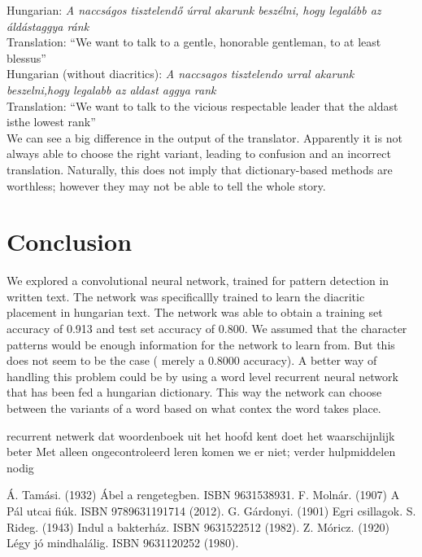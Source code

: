 \documentclass[11pt]{article}
\def\tab{\hspace*{1cm}}
\begin{document}
\tab Hungarian: \textit{A naccságos tisztelendő úrral akarunk beszélni, hogy legalább az áldást\break\tab aggya ránk}\\
\tab Translation: ``We want to talk to a gentle, honorable gentleman, to at least bless\break\tab us''\\[2mm]
\tab Hungarian (without diacritics): \textit{A naccsagos tisztelendo urral akarunk beszelni,\break\tab hogy legalabb az aldast aggya rank}\\
\tab Translation: ``We want to talk to the vicious respectable leader that the aldast is\break\tab the lowest rank''\\[2mm]
We can see a big difference in the output of the translator. Apparently it is not always able to choose the right variant, leading to confusion and an incorrect translation. Naturally, this does not imply that dictionary-based methods are worthless; however they may not be able to tell the whole story.
\newpage
\section{Conclusion}
We explored a convolutional neural network, trained for pattern detection in written text. The network was specificallly trained to learn the diacritic placement in hungarian text. The network was able to obtain a training set accuracy of 0.913 and test set accuracy of 0.800. We assumed that the character patterns would be enough information for the network to learn from. But this does not seem to be the case ( merely a 0.8000 accuracy). A better way of handling this problem could be by using a word level recurrent neural network that has been fed a hungarian dictionary. This way the network can choose between the variants of a word based on what contex the word takes place. 


recurrent netwerk dat woordenboek uit het hoofd kent doet het waarschijnlijk beter
Met alleen ongecontroleerd leren komen we er niet; verder hulpmiddelen nodig
\vspace*{\fill}
\begin{thebibliography}{x}
Á. Tamási. (1932) Ábel a rengetegben. ISBN 9631538931.
F. Molnár. (1907) A Pál utcai fiúk. 	ISBN 9789631191714 (2012).
G. Gárdonyi. (1901) Egri csillagok.
S. Rideg. (1943) Indul a bakterház. ISBN 9631522512 (1982).
Z. Móricz. (1920) Légy jó mindhalálig. ISBN 9631120252 (1980).
\end{thebibliography}
\end{document}
